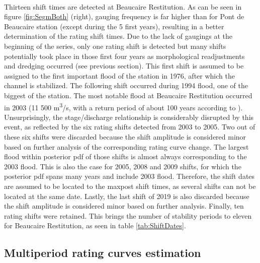 \documentclass[11pt]{article}
\begin{document}
    \paragraph{}    
    Thirteen shift times are detected at Beaucaire Restitution. As can be seen in figure \ref{fig:SegmBoth} (right), gauging frequency is far higher than for Pont de Beaucaire station (except during the 5 first years), resulting in a better determination of the rating shift times. 
    Due to the lack of gaugings at the beginning of the series, only one rating shift is detected but many shifts potentially took place in those first four years as morphological readjustments and dredging occurred (see previous section). This first shift is assumed to be assigned to the first important flood of the station in 1976, after which the channel is stabilized. The following shift occurred during 1994 flood, one of the biggest of the station. The most notable flood at Beaucaire Restitution occurred in 2003 (11 500 m\textsuperscript{3}/s, with a return period of about 100 years according to \citet{medd_debit_2005}). Unsurprisingly, the stage/discharge relationship is considerably disrupted by this event, as reflected by the six rating shifts detected from 2003 to 2005. Two out of these six shifts were discarded because the shift amplitude is considered minor based on further analysis of the corresponding rating curve change. The largest flood within posterior pdf of those shifts is almost always corresponding to the 2003 flood. This is also the case for 2005, 2008 and 2009 shifts, for which the posterior pdf spans many years and include 2003 flood. Therefore, the shift dates are assumed to be located to the maxpost shift times, as several shifts can not be located at the same date. Lastly, the last shift of 2019 is also discarded because the shift amplitude is considered minor based on further analysis. Finally, ten rating shifts were retained. This brings the number of stability periods to eleven for Beaucaire Restitution, as seen in table \ref{tab:ShiftDates}. 
        
    \subsection{Multiperiod rating curves estimation}
\end{document}
